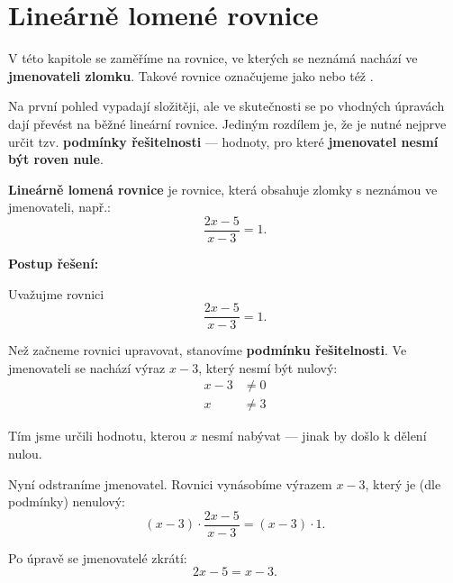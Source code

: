 \documentclass[12pt,a4paper]{article}
\begin{document}
\newpage
\section{Lineárně lomené rovnice}

V této kapitole se zaměříme na rovnice, ve kterých se neznámá nachází ve \textbf{jmenovateli zlomku}.  
Takové rovnice označujeme jako  nebo též .  

\medskip
Na první pohled vypadají složitěji, ale ve skutečnosti se po vhodných úpravách dají převést na běžné lineární rovnice.  
Jediným rozdílem je, že je nutné nejprve určit tzv. \textbf{podmínky řešitelnosti} — hodnoty, pro které \textbf{jmenovatel nesmí být roven nule}.

\begin{definitionbox}
\textbf{Lineárně lomená rovnice} je rovnice, která obsahuje zlomky s neznámou ve jmenovateli, např.:
\[
\frac{2x - 5}{x - 3} = 1.
\]
\end{definitionbox}

\textbf{Postup řešení:}


\medskip 
Uvažujme rovnici
\[
\frac{2x - 5}{x - 3} = 1.
\]

Než začneme rovnici upravovat, stanovíme \textbf{podmínku řešitelnosti}.  
Ve jmenovateli se nachází výraz \(x - 3\), který nesmí být nulový:
\begin{align*}
  x - 3 &\neq 0\\
  x &\neq 3
\end{align*}

Tím jsme určili hodnotu, kterou \(x\) nesmí nabývat — jinak by došlo k dělení nulou.

\medskip
Nyní odstraníme jmenovatel.  
Rovnici vynásobíme výrazem \(x - 3\), který je (dle podmínky) nenulový:
\[
(x - 3)\cdot\frac{2x - 5}{x - 3} = (x - 3)\cdot 1.
\]

Po úpravě se jmenovatelé zkrátí:
\[
2x - 5 = x - 3.
\]
\end{document}

